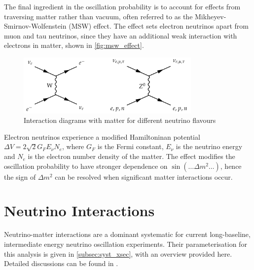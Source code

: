 The final ingredient in the oscillation probability is to account for effects from traversing matter rather than vacuum, often referred to as the Mikheyev-Smirnov-Wolfenstein (MSW) effect\cite{barger,parke,wolfenstein,msw}. The effect sets electron neutrinos apart from muon and tau neutrinos, since they have an additional weak interaction with electrons in matter, shown in \autoref{fig:msw_effect}.
\begin{figure}[h]
	\includegraphics[width=0.8\textwidth, trim={0mm 0mm 0mm 0mm}, clip,page=1]{figures/theory/msw_effect}
	\caption{Interaction diagrams with matter for different neutrino flavours}
	\label{fig:msw_effect}
\end{figure}

Electron neutrinos experience a modified Hamiltoninan potential $\Delta V = 2\sqrt{2}G_F E_\nu N_e$, where $G_F$ is the Fermi constant, $E_\nu$ is the neutrino energy and $N_e$ is the electron number density of the matter. The effect modifies the oscillation probability to have stronger dependence on $\sin \left(\ldots \Delta m^2 \ldots \right)$, hence the sign of $\Delta m^2$ can be resolved when significant matter interactions occur\cite{msw_summary}.

\section{Neutrino Interactions}
\label{sec:theory:int}
Neutrino-matter interactions are a dominant systematic for current long-baseline, intermediate energy neutrino oscillation experiments. Their parameterisation for this analysis is given in \autoref{subsec:syst_xsec}, with an overview provided here. Detailed discussions can be found in \cite{katori_martini,ulrich_review,nieves_review}.

